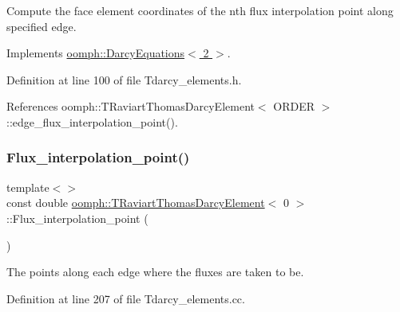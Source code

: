 Compute the face element coordinates of the nth flux interpolation point along specified edge. 



Implements \hyperlink{classoomph_1_1DarcyEquations_a7597d6d7e22f97fd2a6f4ab811dd2b72}{oomph\+::\+Darcy\+Equations$<$ 2 $>$}.



Definition at line 100 of file Tdarcy\+\_\+elements.\+h.



References oomph\+::\+T\+Raviart\+Thomas\+Darcy\+Element$<$ O\+R\+D\+E\+R $>$\+::edge\+\_\+flux\+\_\+interpolation\+\_\+point().

\mbox{\label{classoomph_1_1TRaviartThomasDarcyElement_a3f02285e31cb174243039d51e4541a15}} 
\subsubsection{\texorpdfstring{Flux\+\_\+interpolation\+\_\+point()}{Flux\_interpolation\_point()}\hspace{0.1cm}{\footnotesize\ttfamily [1/2]}}
{\footnotesize\ttfamily template$<$$>$ \\
const double \hyperlink{classoomph_1_1TRaviartThomasDarcyElement}{oomph\+::\+T\+Raviart\+Thomas\+Darcy\+Element}$<$ 0 $>$\+::Flux\+\_\+interpolation\+\_\+point (\begin{DoxyParamCaption}{ }\end{DoxyParamCaption})\hspace{0.3cm}{\ttfamily [private]}}



The points along each edge where the fluxes are taken to be. 



Definition at line 207 of file Tdarcy\+\_\+elements.\+cc.

\mbox{\label{classoomph_1_1TRaviartThomasDarcyElement_adf14750f8c74e32cbd864abce01911e5}} 

